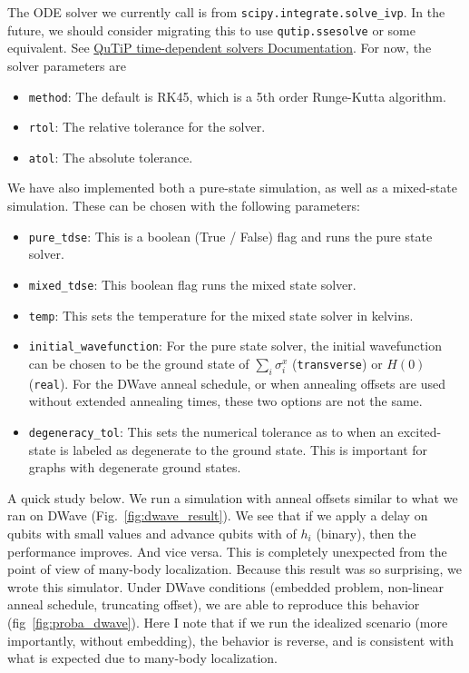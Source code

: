 \documentclass[]{article}
\begin{document}
The ODE solver we currently call is from \texttt{scipy.integrate.solve\_ivp}. In the future, we should consider migrating this to use \texttt{qutip.ssesolve} or some equivalent. See \href{http://qutip.org/docs/latest/guide/dynamics/dynamics-time.html}{QuTiP time-dependent solvers Documentation}. For now, the solver parameters are
\begin{itemize}
	\item \texttt{method}: The default is RK45, which is a 5th order Runge-Kutta algorithm.
	\item \texttt{rtol}: The relative tolerance for the solver.
	\item \texttt{atol}: The absolute tolerance.
\end{itemize}

We have also implemented both a pure-state simulation, as well as a mixed-state simulation.
These can be chosen with the following parameters:

\begin{itemize}
	\item \texttt{pure\_tdse}: This is a boolean (True / False) flag and runs the pure state solver.
	\item \texttt{mixed\_tdse}: This boolean flag runs the mixed state solver.
	\item \texttt{temp}: This sets the temperature for the mixed state solver in kelvins.
	\item \texttt{initial\_wavefunction}: For the pure state solver, the initial wavefunction can be chosen to be the ground state of $\sum_i \sigma_i^x$ (\texttt{transverse}) or $H(0)$ (\texttt{real}). For the DWave anneal schedule, or when annealing offsets are used without extended annealing times, these two options are not the same.
	\item \texttt{degeneracy\_tol}: This sets the numerical tolerance as to when an excited-state is labeled as degenerate to the ground state. This is important for graphs with degenerate ground states.
\end{itemize}

A quick study below. We run a simulation with anneal offsets similar to what we ran on DWave (Fig.~\ref{fig:dwave_result}). We see that if we apply a delay on qubits with small values and advance qubits with of $h_i$ (binary), then the performance improves. And vice versa. This is completely unexpected from the point of view of many-body localization. Because this result was so surprising, we wrote this simulator. Under DWave conditions (embedded problem, non-linear anneal schedule, truncating offset), we are able to reproduce this behavior (fig~\ref{fig:proba_dwave}). Here I note that if we run the idealized scenario (more importantly, without embedding), the behavior is reverse, and is consistent with what is expected due to many-body localization.
\end{document}
